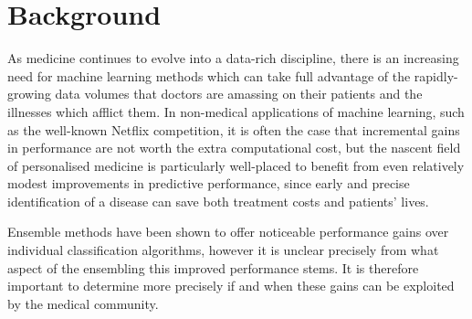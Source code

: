 \documentclass{bmcart}
\begin{document}


\section*{Background}
As medicine continues to evolve into a data-rich discipline, there is an increasing need for machine learning methods which can take full advantage of the rapidly-growing data volumes that doctors are amassing on their patients and the illnesses which afflict them. In non-medical applications of machine learning, such as the well-known Netflix competition\cite{netflixprize}, it is often the case that incremental gains in performance are not worth the extra computational cost, but the nascent  field of personalised medicine is particularly well-placed to benefit from even  relatively modest improvements in  predictive performance, since early  and precise identification of a disease can save both treatment costs and patients' lives. 

Ensemble methods have been shown to offer noticeable performance gains over individual classification algorithms\cite{Opitz}\cite{Polikar}\cite{Rokach}, 
however it is unclear precisely from what aspect of the ensembling this improved performance stems.  It is therefore important to determine more precisely if and when these gains can be exploited by the medical community.
\end{document}
